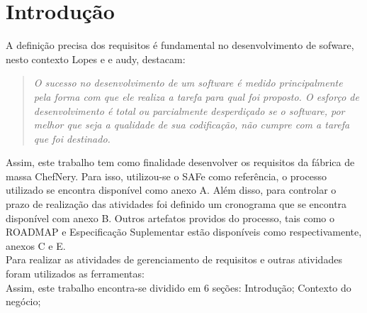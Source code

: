 
\chapter[Introdução]{Introdução}

A definição precisa dos requisitos é fundamental  no desenvolvimento de sofware, nesto contexto Lopes e  e audy, destacam:

\begin{quotation}
\textit{O sucesso no desenvolvimento de um software é medido principalmente pela forma com que ele realiza a tarefa para qual foi proposto. O esforço de desenvolvimento é total ou parcialmente desperdiçado se o software, por melhor que seja a qualidade de sua codificação, não cumpre com a tarefa que foi destinado.}
\end{quotation}

\tab Assim, este trabalho tem como finalidade desenvolver os requisitos da fábrica de massa ChefNery. Para isso, utilizou-se o SAFe como referência, o processo utilizado se encontra disponível como anexo A.  Além disso, para controlar o prazo de realização das atividades foi definido um cronograma que se encontra disponível com anexo B. Outros artefatos providos do processo, tais como o ROADMAP e Especificação Suplementar estão disponíveis como respectivamente, anexos C e E. \\
\tab Para realizar as atividades de gerenciamento de requisitos e outras atividades foram utilizados as ferramentas: \\
\tab Assim, este trabalho encontra-se dividido em 6 seções: Introdução; Contexto do negócio; \\